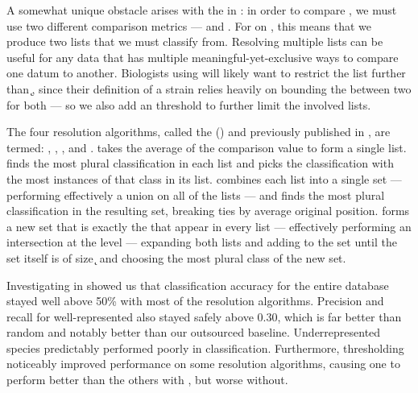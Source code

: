 A somewhat unique obstacle arises with the \ecoli{} \isols{} in \cplop{}: in order to compare \isols{}, we must use two different comparison metrics --- \pcsixt{} and \pcfive{}.
For \kNN{} on \cplop{} \ecoli{} \isols{}, this means that we produce two \knnlong{} lists that we must classify from.
Resolving multiple \kNN{} lists can be useful for any data that has multiple meaningful-yet-exclusive ways to compare one datum to another.
Biologists using \kNN{} will likely want to restrict the list further than \k{}, since their definition of a strain relies heavily on bounding the \pearson{} between two \isols{} for both \itsshort{} --- so we also add an \a{} threshold to further limit the involved \kNN{} lists.

The four resolution algorithms, called the \krapmed{} (\krap{}) and previously published in \cite{DBLP:conf/bibm/McGovernDKBVG15}, are termed: \rmean{}, \rwinner{}, \runion{}, and \rintersect{}.
\rmean{} takes the average of the comparison value to form a single \kNN{} list.
\rwinner{} finds the most plural classification in each \kNN{} list and picks the classification with the most instances of that class in its list.
\runion{} combines each \kNN{} list into a single set --- performing effectively a union on all of the \kNN{} lists --- and finds the most plural classification in the resulting set, breaking ties by average original position.
\rintersect{} forms a new set that is exactly the \isols{} that appear in every \kNN{} list --- effectively performing an intersection at the \isol{} level --- expanding both lists and adding to the set until the set itself is of size \k{} and choosing the most plural class of the new set.

Investigating \krap{} in \cite{DBLP:conf/bibm/McGovernDKBVG15} showed us that classification accuracy for the entire database stayed well above 50\% with most of the resolution algorithms.
Precision and recall for well-represented \spec{} also stayed safely above 0.30, which is far better than random and notably better than our outsourced baseline.
Underrepresented species predictably performed poorly in classification.
Furthermore, \a{} thresholding noticeably improved performance on some resolution algorithms, causing one to perform better than the others with \a{}, but worse without.



